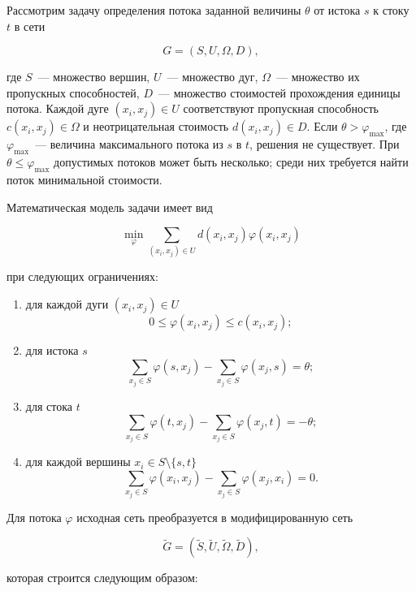 Рассмотрим задачу определения потока заданной величины $\theta$ от истока $s$ к стоку $t$ в сети

\[
G=(S,U,\Omega,D),
\]

где $S$~--- множество вершин, $U$~--- множество дуг, $\Omega$~--- множество их пропускных способностей, $D$~--- множество стоимостей прохождения единицы потока. Каждой дуге $(x_i,x_j)\in U$ соответствуют пропускная способность $c(x_i,x_j)\in\Omega$ и неотрицательная стоимость $d(x_i,x_j)\in D$. Если $\theta>\varphi_{\max}$, где $\varphi_{\max}$~--- величина максимального потока из $s$ в $t$, решения не существует. При $\theta\leq\varphi_{\max}$ допустимых потоков может быть несколько; среди них требуется найти поток минимальной стоимости.

Математическая модель задачи имеет вид

\[
\min_{\varphi}\sum_{(x_i,x_j)\in U}
d(x_i,x_j)\varphi(x_i,x_j)
\]

при следующих ограничениях:

\begin{enumerate}
    \item для каждой дуги $(x_i,x_j)\in U$
    \[
    0\leq\varphi(x_i,x_j)\leq c(x_i,x_j);
    \]

    \item для истока $s$
    \[
    \sum_{x_j\in S}\varphi(s,x_j)-
    \sum_{x_j\in S}\varphi(x_j,s)=\theta;
    \]

    \item для стока $t$
    \[
    \sum_{x_j\in S}\varphi(t,x_j)-
    \sum_{x_j\in S}\varphi(x_j,t)=-\theta;
    \]

    \item для каждой вершины $x_i\in S\setminus\{s,t\}$
    \[
    \sum_{x_j\in S}\varphi(x_i,x_j)-
    \sum_{x_j\in S}\varphi(x_j,x_i)=0.
    \]
\end{enumerate}

Для потока $\varphi$ исходная сеть преобразуется в модифицированную сеть

\[
\widetilde G=(\widetilde S,\widetilde U,\widetilde\Omega,\widetilde D),
\]

которая строится следующим образом:


